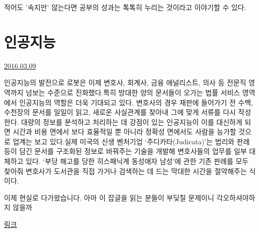적어도 '속지만' 않는다면 공부의 성과는 톡톡히 누리는 것이라고 이야기할 수 있다.
\vspace{5mm}






\section{인공지능}
\href{https://www.kockoc.com/Apoc/669606}{2016.03.09}

\vspace{5mm}

인공지능의 발전으로 로봇은 이제 변호사, 회계사, 금융 애널리스트, 의사 등 전문직 영역까지 넘보는 수준으로 진화했다.특히 방대한 양의 문서들이 오가는 법률 서비스 영역에서 인공지능의 역할은 더욱 기대되고 있다. 변호사의 경우 재판에 들어가기 전 수백, 수천장의 문서를 일일이 읽고, 새로운 사실관계를 찾아내 그에 맞게 서류를 다시 작성한다. 대량의 정보를 분석하고 처리하는 데 강점이 있는 인공지능이 이를 대신하게 되면 시간과 비용 면에서 보다 효율적일 뿐 아니라 정확성 면에서도 사람을 능가할 것으로 업계는 보고 있다.실제 미국의 신생 벤처기업 ‘주디카타(Judicata)’는 법리와 판례 등이 담긴 문서를 구조화된 정보로 바꿔주는 기술을 개발해 변호사들의 업무를 일부 대체하고 있다. ‘부당 해고를 당한 히스패닉계 동성애자 남성’에 관한 기존 판례를 모두 찾아줘 변호사가 도서관을 직접 가거나 검색하는 데 드는 막대한 시간을 절약해주는 식이다.
\vspace{5mm}

이제 현실로 다가왔습니다. 아마 이 잡글을 읽는 분들이 부딪칠 문제이니 각오하셔야하지 않을까
\vspace{5mm}

\href{http://news.naver.com/main/read.nhn?mode=LSD&mid=shm&sid1=105&oid=015&aid=0003544035}{링크}
\vspace{5mm}

